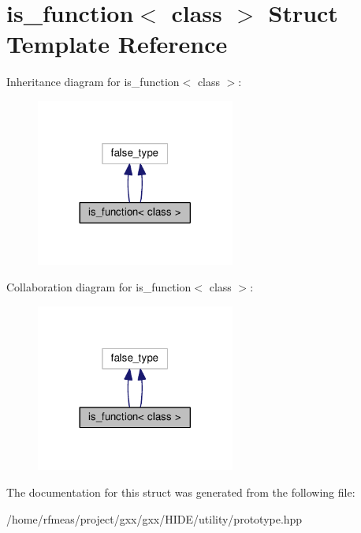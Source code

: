 \hypertarget{structis__function}{}\section{is\+\_\+function$<$ class $>$ Struct Template Reference}
\label{structis__function}


Inheritance diagram for is\+\_\+function$<$ class $>$\+:
\nopagebreak
\begin{figure}[H]
\begin{center}
\leavevmode
\includegraphics[width=185pt]{structis__function__inherit__graph}
\end{center}
\end{figure}


Collaboration diagram for is\+\_\+function$<$ class $>$\+:
\nopagebreak
\begin{figure}[H]
\begin{center}
\leavevmode
\includegraphics[width=185pt]{structis__function__coll__graph}
\end{center}
\end{figure}


The documentation for this struct was generated from the following file\+:\begin{DoxyCompactItemize}
\item 
/home/rfmeas/project/gxx/gxx/\+H\+I\+D\+E/utility/prototype.\+hpp\end{DoxyCompactItemize}
